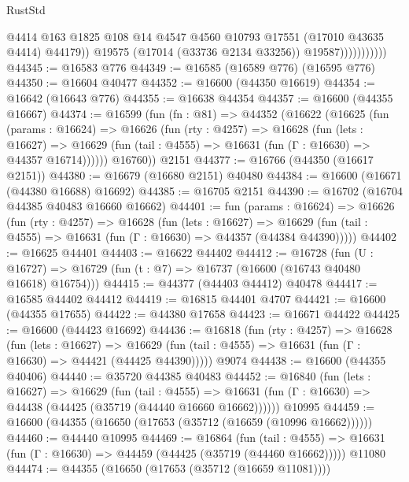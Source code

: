 \begin{lexlean}{RustStd}
\begin{coremodule}
                              @4414
                              @163
                              @1825
                              @108
                              @14
                              @4547
                              @4560
                              @10793
                              @17551
                              (@17010 @43635 @4414)
                              @44179))
                          @19575
                          (@17014 (@33736 @2134 @33256))
                          @19587)))))))))))
@44345 := @16583 @776
@44349 := @16585 (@16589 @776) (@16595 @776)
@44350 := @16604 @40477
@44352 := @16600 (@44350 @16619)
@44354 := @16642 (@16643 @776)
@44355 := @16638 @44354
@44357 := @16600 (@44355 @16667)
@44374 := @16599
    (fun (fn : @81) =>
    @44352
      (@16622
        (@16625
          (fun (params : @16624) =>
          @16626
            (fun (rty : @4257) =>
            @16628
              (fun (lets : @16627) =>
              @16629 (fun (tail : @4555) => @16631 (fun (Γ : @16630) => @44357 @16714))))))
        @16760))
    @2151
@44377 := @16766 (@44350 (@16617 @2151))
@44380 := @16679 (@16680 @2151) @40480
@44384 := @16600 (@16671 (@44380 @16688) @16692)
@44385 := @16705 @2151
@44390 := @16702 (@16704 @44385 @40483 @16660 @16662)
@44401 := fun (params : @16624) =>
  @16626
    (fun (rty : @4257) =>
    @16628
      (fun (lets : @16627) =>
      @16629 (fun (tail : @4555) => @16631 (fun (Γ : @16630) => @44357 (@44384 @44390)))))
@44402 := @16625 @44401
@44403 := @16622 @44402
@44412 := @16728
    (fun (U : @16727) => @16729 (fun (t : @7) => @16737 (@16600 (@16743 @40480 @16618) @16754)))
@44415 := @44377 (@44403 @44412) @40478
@44417 := @16585 @44402 @44412
@44419 := @16815 @44401 @4707
@44421 := @16600 (@44355 @17655)
@44422 := @44380 @17658
@44423 := @16671 @44422
@44425 := @16600 (@44423 @16692)
@44436 := @16818
    (fun (rty : @4257) =>
    @16628
      (fun (lets : @16627) =>
      @16629 (fun (tail : @4555) => @16631 (fun (Γ : @16630) => @44421 (@44425 @44390)))))
    @9074
@44438 := @16600 (@44355 @40406)
@44440 := @35720 @44385 @40483
@44452 := @16840
    (fun (lets : @16627) =>
    @16629
      (fun (tail : @4555) =>
      @16631 (fun (Γ : @16630) => @44438 (@44425 (@35719 (@44440 @16660 @16662))))))
    @10995
@44459 := @16600 (@44355 (@16650 (@17653 (@35712 (@16659 (@10996 @16662))))))
@44460 := @44440 @10995
@44469 := @16864
    (fun (tail : @4555) => @16631 (fun (Γ : @16630) => @44459 (@44425 (@35719 (@44460 @16662)))))
    @11080
@44474 := @44355 (@16650 (@17653 (@35712 (@16659 @11081))))

\end{coremodule}
\end{lexlean}
